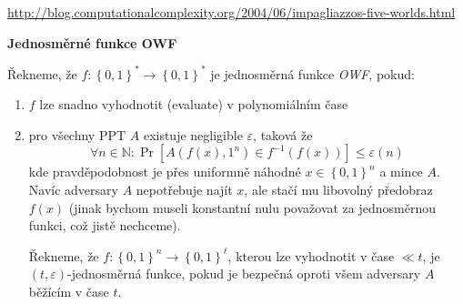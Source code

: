\documentclass[a4paper,12pt,titlepage]{article}
\def\podnadpis#1{{\bigskip\bf\noindent#1\medskip\par}}
\def\definice{\noindent {\bf Definice: }}
\begin{document}
\url{http://blog.computationalcomplexity.org/2004/06/impagliazzos-five-worlds.html}

\podnadpis{Jednosměrné funkce OWF}

\definice Řekneme, že $f \colon \left\{ 0,1 \right\}^* \rightarrow \left\{ 0,1 \right\}^*$ je jednosměrná funkce \emph{OWF}, pokud:
\begin{enumerate}
	\item  $f$ lze snadno vyhodnotit (evaluate) v polynomiálním čase
	\item  pro všechny PPT $A$ existuje negligible $\varepsilon$, taková že
		$$\forall n \in \mathbb{N} \colon \Pr[A(f(x), 1^n) \in f^{-1}(f(x))] \leq \varepsilon(n)$$
		kde pravděpodobnost je přes uniformně náhodné $x \in \left\{ 0,1 \right\}^n$ a mince $A$.
		Navíc adversary $A$ nepotřebuje najít $x$, ale stačí mu libovolný předobraz $f(x)$ (jinak bychom museli konstantní nulu považovat za jednosměrnou funkci, což jistě nechceme).

		Řekneme, že $f \colon \left\{ 0,1 \right\}^n \rightarrow \left\{ 0,1 \right\}^{\ell}$, kterou lze vyhodnotit v čase $\ll t$, je $(t, \varepsilon)$-jednosměrná funkce, pokud je bezpečná oproti všem adversary $A$ běžícím v čase $t$.
\end{enumerate}
\end{document}
